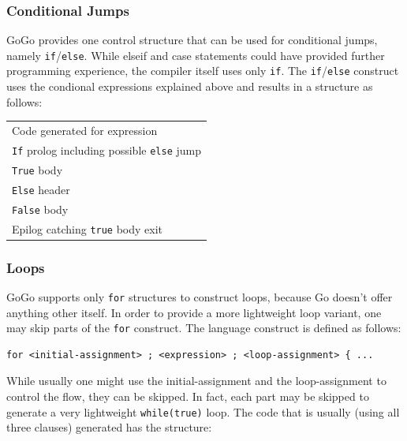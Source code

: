 \documentclass[a4paper]{scrartcl}
\let\subsection\subsubsection
\let\subsubsection\paragraph
\let\paragraph\subparagraph
\let\subparagraph\undefined
\begin{document}
    \subsection{Conditional Jumps}
      GoGo provides one control structure that can be used for conditional jumps,
      namely \texttt{if}/\texttt{else}. While elseif and case statements could
      have provided further programming experience, the compiler itself uses only
      \texttt{if}. The \texttt{if}/\texttt{else} construct uses the condional
      expressions explained above and results in a structure as follows:
      \begin{table}[hbt]
        \centering
        \begin{tabular}{l}
          \toprule
          Code generated for expression\\
          \texttt{If} prolog including possible \texttt{else} jump\\
          \hspace{0.5cm} \texttt{True} body\\
          \texttt{Else} header\\
          \hspace{0.5cm} \texttt{False} body\\
          Epilog catching \texttt{true} body exit\\
          \bottomrule
        \end{tabular}
      \end{table}

    \subsection{Loops}
      GoGo supports only \texttt{for} structures to construct loops, because
      Go doesn't offer anything other itself. In order to provide a more 
      lightweight loop variant, one may skip parts of the \texttt{for} construct.
      The language construct is defined as follows:
      \begin{lstlisting}
for <initial-assignment> ; <expression> ; <loop-assignment> { ...
      \end{lstlisting}

      While usually one might use the initial-assignment and the loop-assignment
      to control the flow, they can be skipped. In fact, each part may be skipped
      to generate a very lightweight \texttt{while(true)} loop. The code that is
      usually (using all three clauses) generated has the structure:
\end{document}

